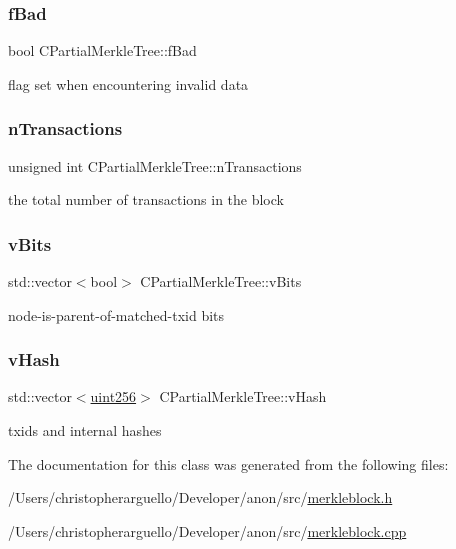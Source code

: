 \subsubsection{\texorpdfstring{f\+Bad}{fBad}}
{\footnotesize\ttfamily bool C\+Partial\+Merkle\+Tree\+::f\+Bad\hspace{0.3cm}{\ttfamily [protected]}}

flag set when encountering invalid data \mbox{\label{class_c_partial_merkle_tree_a0d3bd530f19f2c75c140a05c6f99782a}} 
\subsubsection{\texorpdfstring{n\+Transactions}{nTransactions}}
{\footnotesize\ttfamily unsigned int C\+Partial\+Merkle\+Tree\+::n\+Transactions\hspace{0.3cm}{\ttfamily [protected]}}

the total number of transactions in the block \mbox{\label{class_c_partial_merkle_tree_a22a522d1fb8d449f4c91b65283339e7d}} 
\subsubsection{\texorpdfstring{v\+Bits}{vBits}}
{\footnotesize\ttfamily std\+::vector$<$bool$>$ C\+Partial\+Merkle\+Tree\+::v\+Bits\hspace{0.3cm}{\ttfamily [protected]}}

node-\/is-\/parent-\/of-\/matched-\/txid bits \mbox{\label{class_c_partial_merkle_tree_a863cf9024be1b8fa97db08dfd6dbd687}} 
\subsubsection{\texorpdfstring{v\+Hash}{vHash}}
{\footnotesize\ttfamily std\+::vector$<$\mbox{\hyperlink{classuint256}{uint256}}$>$ C\+Partial\+Merkle\+Tree\+::v\+Hash\hspace{0.3cm}{\ttfamily [protected]}}

txids and internal hashes 

The documentation for this class was generated from the following files\+:\begin{DoxyCompactItemize}
\item 
/\+Users/christopherarguello/\+Developer/anon/src/\mbox{\hyperlink{merkleblock_8h}{merkleblock.\+h}}\item 
/\+Users/christopherarguello/\+Developer/anon/src/\mbox{\hyperlink{merkleblock_8cpp}{merkleblock.\+cpp}}\end{DoxyCompactItemize}
